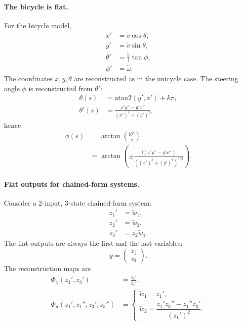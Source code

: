 \paragraph{The bicycle is flat.}
For the bicycle model,
\begin{align}
    x' &= \tilde{v} \cos\theta, \\
    y' &= \tilde{v} \sin\theta, \\
    \theta' &= \frac{\tilde{v}}{l} \tan\phi, \\
    \phi' &= \tilde{\omega}.
\end{align}
The coordinates \( x, y, \theta \) are reconstructed as in the
unicycle case. The steering angle \( \phi \) is reconstructed from
\( \theta' \):
\begin{align}
    \theta(s) &= \text{atan2}(y', x') + k\pi, \\
    \theta'(s) &= \frac{x' y'' - y' x''}{(x')^2 + (y')^2},
\end{align}
hence
\begin{align}
    \phi(s) &= \arctan\!\left(\frac{l \theta'}{\tilde{v}}\right) \\
            &= \arctan\!\left(
               \pm \frac{l (x' y'' - y' x'')}
                         {\left((x')^2 + (y')^2\right)^{3/2}}
               \right).
\end{align}

\paragraph{Flat outputs for chained-form systems.}
Consider a 2-input, 3-state chained-form system:
\begin{align}
    z_1' &= \tilde{w}_1, \\
    z_2' &= \tilde{w}_2, \\
    z_3' &= z_2 \tilde{w}_1.
\end{align}
The flat outputs are always the first and the last variables:
\[
y = \begin{pmatrix} z_1 \\ z_3 \end{pmatrix}.
\]
The reconstruction maps are
\begin{align}
    \Phi_x(z_1', z_3') &= \frac{z_3'}{z_1'}, \\
    \Phi_u(z_1', z_1'', z_3', z_3'') &=
    \begin{cases}
        \tilde{w}_1 = z_1', \\[1ex]
        \tilde{w}_2 = \dfrac{z_1' z_3'' - z_1'' z_3'}{(z_1')^2}.
    \end{cases}
\end{align}

